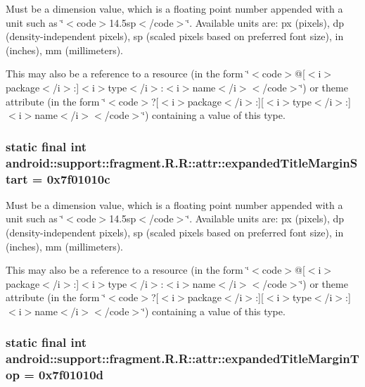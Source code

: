 Must be a dimension value, which is a floating point number appended with a unit such as \char`\"{}$<$code$>$14.5sp$<$/code$>$\char`\"{}. Available units are: px (pixels), dp (density-independent pixels), sp (scaled pixels based on preferred font size), in (inches), mm (millimeters). 

This may also be a reference to a resource (in the form \char`\"{}$<$code$>$@\mbox{[}$<$i$>$package$<$/i$>$:\mbox{]}$<$i$>$type$<$/i$>$:$<$i$>$name$<$/i$>$$<$/code$>$\char`\"{}) or theme attribute (in the form \char`\"{}$<$code$>$?\mbox{[}$<$i$>$package$<$/i$>$:\mbox{]}\mbox{[}$<$i$>$type$<$/i$>$:\mbox{]}$<$i$>$name$<$/i$>$$<$/code$>$\char`\"{}) containing a value of this type. \hypertarget{classandroid_1_1support_1_1fragment_1_1_r_1_1attr_5cdc2d5544c9c0f5825932509e44bd62}{
\subsubsection[{expandedTitleMarginStart}]{\setlength{\rightskip}{0pt plus 5cm}static final int android::support::fragment.R.R::attr::expandedTitleMarginStart = 0x7f01010c}}
\label{classandroid_1_1support_1_1fragment_1_1_r_1_1attr_5cdc2d5544c9c0f5825932509e44bd62}


Must be a dimension value, which is a floating point number appended with a unit such as \char`\"{}$<$code$>$14.5sp$<$/code$>$\char`\"{}. Available units are: px (pixels), dp (density-independent pixels), sp (scaled pixels based on preferred font size), in (inches), mm (millimeters). 

This may also be a reference to a resource (in the form \char`\"{}$<$code$>$@\mbox{[}$<$i$>$package$<$/i$>$:\mbox{]}$<$i$>$type$<$/i$>$:$<$i$>$name$<$/i$>$$<$/code$>$\char`\"{}) or theme attribute (in the form \char`\"{}$<$code$>$?\mbox{[}$<$i$>$package$<$/i$>$:\mbox{]}\mbox{[}$<$i$>$type$<$/i$>$:\mbox{]}$<$i$>$name$<$/i$>$$<$/code$>$\char`\"{}) containing a value of this type. \hypertarget{classandroid_1_1support_1_1fragment_1_1_r_1_1attr_8fb003875b30e278c52c1ed5f51f47a2}{
\subsubsection[{expandedTitleMarginTop}]{\setlength{\rightskip}{0pt plus 5cm}static final int android::support::fragment.R.R::attr::expandedTitleMarginTop = 0x7f01010d}}
\label{classandroid_1_1support_1_1fragment_1_1_r_1_1attr_8fb003875b30e278c52c1ed5f51f47a2}


